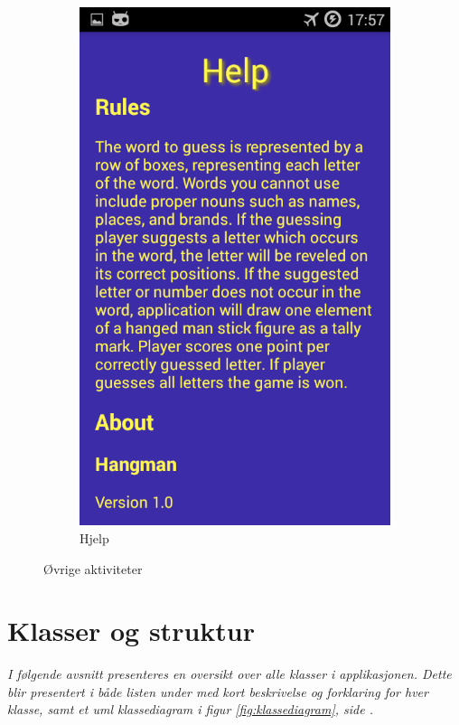 \begin{figure}[ht]
\begin{subfigure}[b]{0.25\textwidth}
        \includegraphics[width=\textwidth]{./img/bruksanvisning/13.png}
        \caption{Hjelp}
        \label{fig:aktivitet_hjelp}
    \end{subfigure}
    \caption{Øvrige aktiviteter}\label{fig:aktiviteter_ovrige}
\end{figure}



\chapter{Klasser og struktur}

\emph{I følgende avsnitt presenteres en oversikt over alle klasser i applikasjonen. Dette blir presentert i både listen under med kort beskrivelse og forklaring for hver klasse, samt et uml klassediagram i figur \ref{fig:klassediagram}, side \pageref{fig:klassediagram}.}
\\

